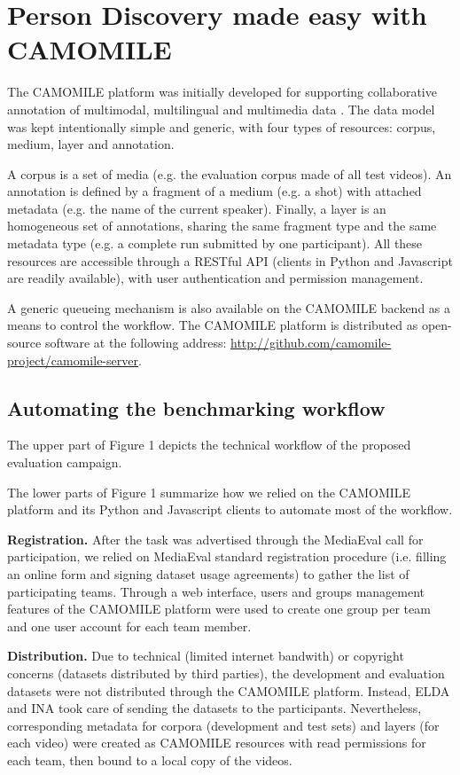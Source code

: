 \documentclass[10pt, a4paper]{article}
\begin{document}
\section{Person Discovery made easy with CAMOMILE}


The CAMOMILE platform was initially developed for supporting collaborative
annotation of multimodal, multilingual and multimedia data \cite{Poignant2016b}. The data model
was kept intentionally simple and generic, with four types of resources:
corpus, medium, layer and annotation.

A corpus is a set of media (e.g. the
evaluation corpus made of all test videos). An annotation is defined by a
fragment of a medium (e.g. a shot) with attached metadata (e.g. the name
of the current speaker). Finally, a layer is an homogeneous set of annotations,
sharing the same fragment type and the same metadata type (e.g. a complete run
submitted by one participant). All these resources are accessible through a
RESTful API (clients in Python and Javascript are readily available), with user
authentication and permission management.

A generic queueing mechanism is also
available on the CAMOMILE backend as a means to control the workflow. The
CAMOMILE platform is distributed as open-source software at the following
address: \url{http://github.com/camomile-project/camomile-server}.


\subsection{Automating the benchmarking workflow}

The upper part of Figure 1 depicts the technical workflow of the proposed
evaluation campaign.

The lower parts of Figure 1 summarize how we relied on the CAMOMILE platform
and its Python and Javascript clients to automate most of the workflow.

\textbf{Registration.} After the task was advertised through the MediaEval call for
participation, we relied on MediaEval standard registration procedure (i.e.
filling an online form and signing dataset usage agreements) to gather the list
of participating teams. Through a web interface, users and groups management
features of the CAMOMILE platform were used to create one group per team and
one user account for each team member.

\textbf{Distribution.}  Due to technical (limited internet bandwith) or copyright
concerns (datasets distributed by third parties), the development and
evaluation datasets were not distributed through the CAMOMILE platform.
Instead, ELDA and INA took care of sending the datasets to the participants.
Nevertheless, corresponding metadata for corpora (development and test sets)
and layers (for each video) were created as CAMOMILE resources with read
permissions for each team, then bound to a local copy of the videos.
\end{document}

